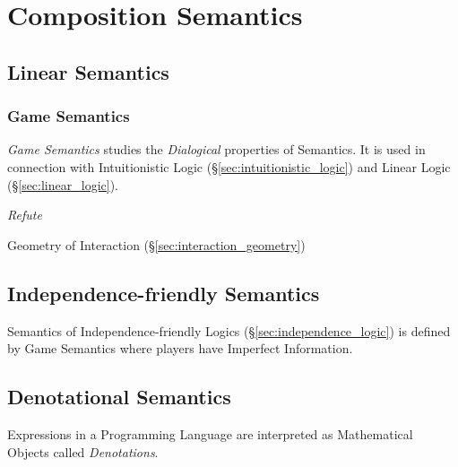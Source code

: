 \section{Composition Semantics}\label{sec:composition_semantics}

\subsection{Linear Semantics}\label{sec:linear_semantics}

\subsubsection{Game Semantics}\label{sec:game_semantics}

\emph{Game Semantics} studies the \emph{Dialogical} properties of
Semantics. It is used in connection with Intuitionistic Logic
(\S\ref{sec:intuitionistic_logic}) and Linear Logic
(\S\ref{sec:linear_logic}).

\emph{Refute}

Geometry of Interaction (\S\ref{sec:interaction_geometry})



\subsection{Independence-friendly Semantics}
\label{sec:independence_semantics}

Semantics of Independence-friendly Logics
(\S\ref{sec:independence_logic}) is defined by Game Semantics where
players have Imperfect Information.



\subsection{Denotational Semantics}\label{sec:denotational_semantics}

Expressions in a Programming Language are interpreted as Mathematical
Objects called \emph{Denotations}.

